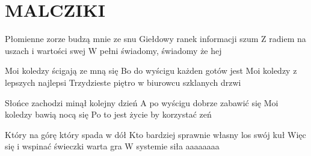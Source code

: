 \documentclass[../../../songbook.tex]{subfiles}
\begin{document}
\TabPositions{8cm} %
\section*{MALCZIKI}
{}
\vspace{0.5cm}
Płomienne zorze budzą mnie ze snu  	 \newline
Giełdowy ranek informacji szum 		  \newline
Z radiem na uszach i wartości swej    \newline
W pełni świadomy, świadomy że hej 	    \newline

Moi koledzy ścigają ze mną się \newline
Bo do wyścigu każden gotów jest \newline
Moi koledzy z lepszych najlepsi \newline
Trzydzieste piętro w biurowcu szklanych drzwi \newline

Słońce zachodzi minął kolejny dzień \newline
A po wyścigu dobrze zabawić się \newline
Moi koledzy bawią nocą się \newline
Po to jest życie by korzystać zeń \newline

Który na górę który spada w dół \newline
Kto bardziej sprawnie własny los swój kuł \newline
Więc się i wspinać świeczki warta gra \newline
W systemie siła aaaaaaaa \newline
\end{document}
